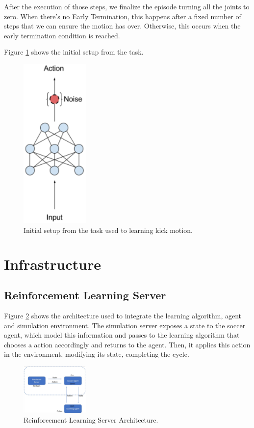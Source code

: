 After the execution of those steps, we finalize the episode turning all the joints to zero. When there's no Early Termination, this happens after a fixed number of steps that we can ensure the motion has over. Otherwise, this occurs when the early termination condition is reached.

Figure \ref{taskdescription} shows the initial setup from the task.


\begin{figure}[!htbp]
	\centering
	\includegraphics[width=0.3\textwidth]{Cap5/gaussiannoise.eps}
	\caption{Initial setup from the task used to learning kick motion.}
	\label{taskdescription}
\end{figure}

\section{Infrastructure}
\subsection{Reinforcement Learning Server}\label{rlarchitecture}

Figure \ref{rlserver} shows the architecture used to integrate the learning algorithm, agent and simulation environment. The simulation server exposes a state to the soccer agent, which model this information and passes to the learning algorithm that chooses a action accordingly and returns to the agent. Then, it applies this action in the environment, modifying its state, completing the cycle.

\begin{figure}[!htbp]
	\centering
	\includegraphics[width=0.3\textwidth]{Cap5/rlserver.eps}
	\caption{Reinforcement Learning Server Architecture.
		\cite{tgmuzio}
	}
	\label{rlserver}
\end{figure}

